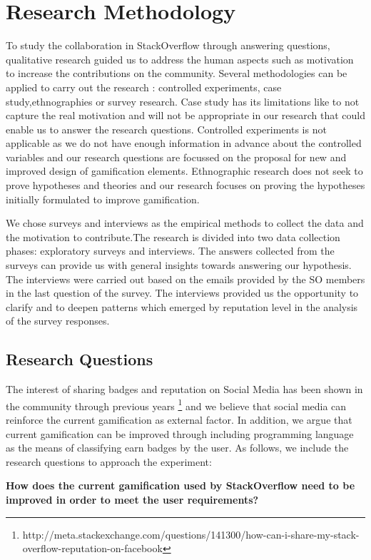 \documentclass{sigchi}
\begin{document}
\section{Research Methodology}
To study the collaboration in StackOverflow through answering questions, qualitative research \cite{Easterbrook} guided us to address the human aspects such as motivation to increase the contributions on the community. Several methodologies can be applied to carry out the research : controlled experiments, case study,ethnographies or survey research. Case study has its limitations like to not capture the real motivation and will not be appropriate in our research that could enable us to answer the research questions. Controlled experiments is not applicable as we do not have enough information in advance about the controlled variables and our research questions are focussed on the proposal for new and improved design of gamification elements. Ethnographic research does not seek to prove hypotheses and theories\cite{Easterbrook} and our research focuses on proving the hypotheses initially formulated to improve gamification.


We chose surveys and interviews as the empirical methods to collect the data and the motivation to contribute.The research is divided into two data collection phases: exploratory surveys and interviews. The answers collected from the surveys can provide us with general insights towards answering our hypothesis. The interviews were carried out based on the emails provided by the SO members in the last question of the survey. The interviews provided us the opportunity to clarify and to deepen patterns which emerged by reputation level in the analysis of the survey responses.

\subsection{Research Questions}
The interest of sharing badges and reputation on Social Media has been shown in the community through previous years \footnote{http://meta.stackexchange.com/questions/141300/how-can-i-share-my-stack-overflow-reputation-on-facebook} and we believe that social media can reinforce the current gamification as external factor. In addition, we argue that current gamification can be improved through including programming language as the means of classifying earn badges by the user. As follows, we include the research questions to approach the experiment:

\textbf{How does the current gamification used by StackOverflow need to be improved in order to meet the user requirements?}
\end{document}
